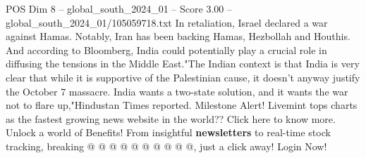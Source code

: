 \begin{textsample}{POS Dim 8 – global\_south\_2024\_01 – Score 3.00 – global\_south\_2024\_01/105059718.txt}
In retaliation, Israel declared a war against Hamas.
Notably, Iran has been backing Hamas, Hezbollah and Houthis.
And according to Bloomberg, India could potentially play a crucial role in diffusing the tensions in the Middle East."The Indian context is that India is very clear that while it is supportive of the Palestinian cause, it doesn't anyway justify the October 7 massacre.
India wants a two-state solution, and it wants the war not to flare up,"Hindustan Times reported.
Milestone Alert!
Livemint tops charts as the fastest growing news website in the world??
Click here to know more.
Unlock a world of Benefits!
From insightful \textbf{newsletters} to real-time stock tracking, breaking @ @ @ @ @ @ @ @ @ @, just a click away!
Login Now!

\end{textsample}
